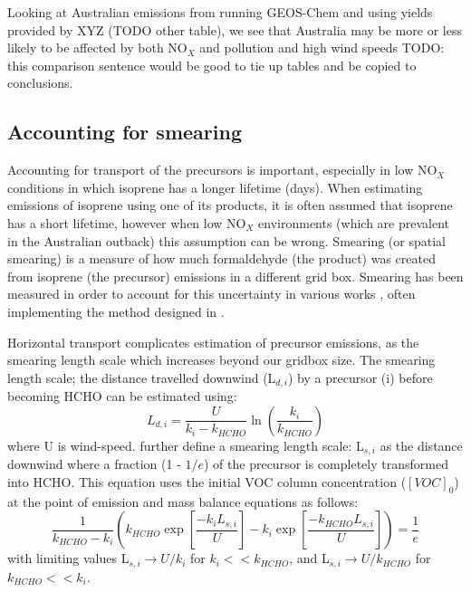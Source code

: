     Looking at Australian emissions from running GEOS-Chem and using yields provided by XYZ (TODO other table), we see that Australia may be more or less likely to be affected by both NO$_X$ and pollution and high wind speeds TODO: this comparison sentence would be good to tie up tables and be copied to conclusions.
  
  \subsection{Accounting for smearing}
    \label{BioIsop:Method:Smearing}
    
    Accounting for transport of the precursors is important, especially in low NO$_X$ conditions in which isoprene has a longer lifetime (days).
    When estimating emissions of isoprene using one of its products, it is often assumed that isoprene has a short lifetime, however when low NO$_X$ environments (which are prevalent in the Australian outback) this assumption can be wrong.
    Smearing (or spatial smearing) is a measure of how much formaldehyde (the product) was created from isoprene (the precursor) emissions in a different grid box.
    Smearing has been measured in order to account for this uncertainty in various works \parencite{Martin2003,Palmer2003,Millet2006,Marais2012,Barkley2013,Zhu2014,Wolfe2016,Surl2018}, often implementing the method designed in \textcite{Palmer2003}.
    
    Horizontal transport complicates estimation of precursor emissions, as the smearing length scale which increases beyond our gridbox size.
    The smearing length scale; the distance travelled downwind (L$_{d,i}$) by a precursor (i) before becoming HCHO can be estimated using:
    \begin{equation*}
      L_{d,i} = \frac{U}{k_i - k_{HCHO}} \ln{ \left( \frac{k_i}{k_{HCHO}} \right) }
    \end{equation*}
    where U is wind-speed.
    \textcite{Palmer2003} further define a smearing length scale: L$_{s,i}$ as the distance downwind where a fraction (1 - $1/e$) of the precursor is completely transformed into HCHO.
    This equation uses the initial VOC column concentration ($[VOC]_0$) at the point of emission and mass balance equations as follows:
    \begin{equation}
    \frac{1}{k_{HCHO}-k_i} \left( k_{HCHO} \exp{ \left[ \frac{-k_i L_{s,i}}{U} \right]} -k_i \exp{ \left[ \frac{-k_{HCHO} L_{s,i}}{U} \right]} \right) = \frac{1}{e} 
    \end{equation}
    with limiting values L$_{s,i} \rightarrow U/k_i$ for $k_i << k_{HCHO}$, and L$_{s,i} \rightarrow U/k_{HCHO}$ for $k_{HCHO} << k_i$.  
    
